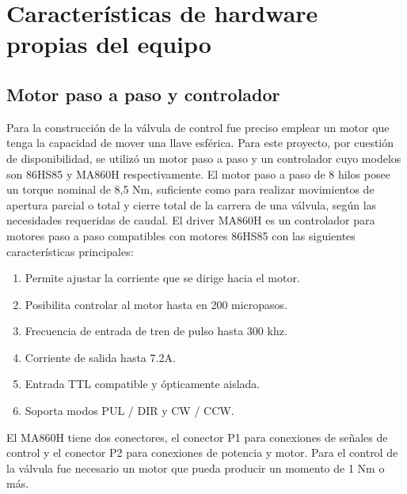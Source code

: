 \section{Características de hardware propias del equipo}
\label{sec:Características propias del equipo}
\subsection{Motor paso a paso y controlador}
Para la construcción de la válvula de control fue preciso emplear un motor  que tenga la capacidad de mover una llave esférica. Para este proyecto, por cuestión de disponibilidad, se utilizó un motor paso a paso y un controlador cuyo modelos son 86HS85 y MA860H respectivamente.
El motor paso a paso de 8 hilos posee un torque nominal de 8,5 Nm, suficiente como para realizar movimientos de apertura parcial o total y cierre total de la carrera de una válvula, según las necesidades requeridas de caudal. 
El driver MA860H es un controlador para motores paso a paso compatibles con motores 86HS85 con las siguientes características principales:

\begin{enumerate}
	\item Permite ajustar la corriente que se dirige hacia el motor.
	\item Posibilita controlar al motor hasta en 200 micropasos.
	\item Frecuencia de entrada de tren de pulso hasta 300 khz. 
	\item Corriente de salida hasta 7.2A.
	\item Entrada TTL compatible y ópticamente aislada.
	\item Soporta modos PUL / DIR y CW / CCW.
\end{enumerate}

El MA860H tiene dos conectores, el conector P1 para conexiones de señales de control y el conector P2 para conexiones de potencia y motor.     
Para el control de la válvula fue necesario un motor que pueda producir un momento de 1 Nm o más. 

